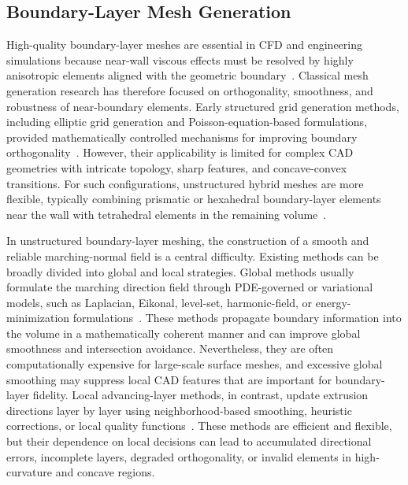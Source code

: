 \documentclass[%
 aip,
 amsmath,amssymb,
 reprint,%
nobibnotes,
]{revtex4-1}
\begin{document}
\subsection{\label{sec:rw_boundary_layer}Boundary-Layer Mesh Generation}
High-quality boundary-layer meshes are essential in CFD and engineering simulations because near-wall viscous effects must be resolved by highly anisotropic elements aligned with the geometric boundary~\cite{baker2005mesh}. Classical mesh generation research has therefore focused on orthogonality, smoothness, and robustness of near-boundary elements. Early structured grid generation methods, including elliptic grid generation and Poisson-equation-based formulations, provided mathematically controlled mechanisms for improving boundary orthogonality~\cite{thompson1987elliptic,sorenson1980poisson}. However, their applicability is limited for complex CAD geometries with intricate topology, sharp features, and concave-convex transitions. For such configurations, unstructured hybrid meshes are more flexible, typically combining prismatic or hexahedral boundary-layer elements near the wall with tetrahedral elements in the remaining volume~\cite{eller2016automated,wang2016hybrid}.

In unstructured boundary-layer meshing, the construction of a smooth and reliable marching-normal field is a central difficulty. Existing methods can be broadly divided into global and local strategies. Global methods usually formulate the marching direction field through PDE-governed or variational models, such as Laplacian, Eikonal, level-set, harmonic-field, or energy-minimization formulations~\cite{zheng2018bem,wang2008eikonal,xia2010levelset,zhu2021harmonic,dyedov2009variational}. These methods propagate boundary information into the volume in a mathematically coherent manner and can improve global smoothness and intersection avoidance. Nevertheless, they are often computationally expensive for large-scale surface meshes, and excessive global smoothing may suppress local CAD features that are important for boundary-layer fidelity. Local advancing-layer methods, in contrast, update extrusion directions layer by layer using neighborhood-based smoothing, heuristic corrections, or local quality functions~\cite{roget2020minimum,wang2016hybrid,eller2016automated}. These methods are efficient and flexible, but their dependence on local decisions can lead to accumulated directional errors, incomplete layers, degraded orthogonality, or invalid elements in high-curvature and concave regions.
\end{document}
